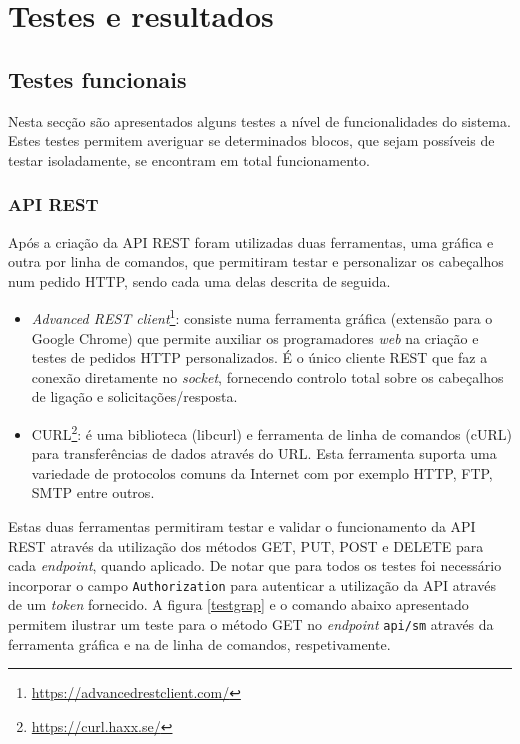 \chapter{Testes e resultados}



\section{Testes funcionais}


Nesta secção são apresentados alguns testes a nível de funcionalidades do sistema. Estes testes permitem averiguar se determinados blocos, que sejam possíveis de testar isoladamente, se encontram em total funcionamento. 

\subsection{\ac{API} \ac{REST}}


Após a criação da API REST foram utilizadas duas ferramentas, uma gráfica e outra por linha de comandos, que permitiram testar e personalizar os cabeçalhos num pedido HTTP, sendo cada uma delas descrita de seguida.


\begin{itemize}
	\item \textit{Advanced REST client}\footnote{\url{https://advancedrestclient.com/}}: consiste numa ferramenta gráfica (extensão para o Google Chrome) que permite auxiliar os programadores \textit{web} na criação e testes de pedidos \ac{HTTP} personalizados. É o único cliente \ac{REST} que faz a conexão diretamente no \textit{socket}, fornecendo controlo total sobre os cabeçalhos de ligação e solicitações/resposta.
	 
	\item CURL\footnote{\url{https://curl.haxx.se/}}: é uma biblioteca (libcurl) e ferramenta de linha de comandos (cURL) para transferências de dados através do \ac{URL}. Esta ferramenta suporta uma variedade de protocolos comuns da Internet com por exemplo \ac{HTTP}, \ac{FTP}, \ac{SMTP} entre outros. 
\end{itemize}


Estas duas ferramentas permitiram testar e validar o funcionamento da API REST através da utilização dos métodos GET, PUT, POST e DELETE para cada \textit{endpoint}, quando aplicado. De notar que para todos os testes foi necessário incorporar o campo \texttt{Authorization} para autenticar a utilização da API através de um \textit{token} fornecido. A figura \ref{testgrap} e o comando abaixo apresentado permitem ilustrar um teste para o método GET no \textit{endpoint} \texttt{api/sm} através da ferramenta gráfica e na de linha de comandos, respetivamente. 






